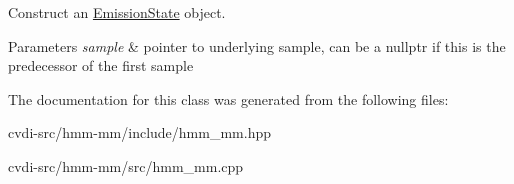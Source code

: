 Construct an \hyperlink{classhmm__mm_1_1EmissionState}{Emission\+State} object. 


\begin{DoxyParams}{Parameters}
{\em sample} & pointer to underlying sample, can be a nullptr if this is the predecessor of the first sample \\
\hline
\end{DoxyParams}


The documentation for this class was generated from the following files\+:\begin{DoxyCompactItemize}
\item 
cvdi-\/src/hmm-\/mm/include/hmm\+\_\+mm.\+hpp\item 
cvdi-\/src/hmm-\/mm/src/hmm\+\_\+mm.\+cpp\end{DoxyCompactItemize}
